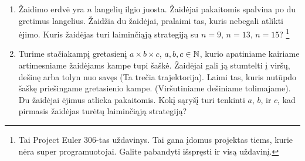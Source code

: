 \begin{enumerate}
  \item Žaidimo erdvė yra $n$ langelių ilgio juosta. Žaidėjai pakaitomis spalvina
    po du gretimus langelius. Žaidžia du žaidėjai, pralaimi tas, kuris nebegali
    atlikti ėjimo. Kuris žaidėjas turi laiminčiąją strategiją su $n=9$, $n=13$,
    $n=15$? \footnote{Tai Project Euler 306-tas uždavinys. Tai gana įdomus projektas
    tiems, kurie nėra super programuotojai. Galite pabandyti išspręsti ir visą
    uždavinį.}


  \item Turime stačiakampį gretasienį $a\times b\times c$, $a,b,c \in \mathbb N$,
    kurio apatiniame kairiame artimesniame žaidėjams kampe tupi šaškė.
    Žaidėjai gali ją stumtelti į viršų, dešinę arba tolyn nuo savęs (Ta
    trečia trajektorija). Laimi tas, kuris nutūpdo šaškę priešingame
    gretasienio kampe. (Viršutiniame dešiniame tolimajame). Du žaidėjai
    ėjimus atlieka pakaitomis. Kokį sąryšį turi tenkinti $a$, $b$, ir $c$,
    kad pirmasis žaidėjas turėtų laiminčiąją strategiją?


\end{enumerate}
